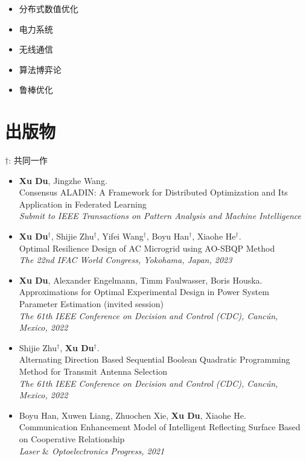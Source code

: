 \documentclass[paper=a4,fontsize=11pt]{scrartcl} %
\newcommand{\NewPart}[1]{\section*{\uppercase{#1}}}
\newcommand{\EducationEntry}[4]{
		\noindent \textbf{#1} \hfill      %
		\colorbox{White}{%
			\parbox{5cm}{%
			\hfill\color{Black}#2}} \par  %
		\noindent \textit{#3} \par        %
		\noindent\hangindent=2em\hangafter=0 \small #4 %
		\normalsize \par}
\begin{document}
\begin{CJK*}{UTF8}{gbsn}
\begin{itemize}
	\item{分布式数值优化}
	
	\item{电力系统}
	\item{无线通信}
	\item{算法博弈论}
		\item{鲁棒优化}
\end{itemize}


\NewPart{出版物}{}
$\dag$:  共同一作
\begin{itemize}
	\item  { \textbf{Xu Du}, Jingzhe Wang. \\
		{Consensus ALADIN: A Framework for
			Distributed Optimization and Its Application in
			Federated Learning}\\
		\emph{ Submit to IEEE Transactions on Pattern Analysis and Machine Intelligence
	} }
	
		\item  { \textbf{Xu Du}$^{\dag}$, Shijie Zhu$^{\dag}$, Yifei Wang$^{\dag}$, Boyu Han$^{\dag}$, Xiaohe He$^{\dag}$. \\
		{Optimal Resilience Design of AC Microgrid
			using AO-SBQP Method}\\
		\emph{ The 22nd IFAC World Congress, Yokohama, Japan, 2023} }
	
	
		\item  { \textbf{Xu Du}, Alexander Engelmann, Timm Faulwasser, Boris Houska. \\
		{Approximations for Optimal Experimental Design
			in Power System Parameter Estimation (invited session)}\\
		\emph{ The 61th IEEE Conference on Decision and Control (CDC), Canc\'un, Mexico, 2022
		} }
	
	
	\item  { Shijie Zhu$^{\dag}$, \textbf{Xu Du}$^{\dag}$. \\
		{Alternating Direction Based Sequential Boolean Quadratic Programming Method for Transmit Antenna Selection}\\
		\emph{ The 61th IEEE Conference on Decision and Control (CDC), Canc\'un, Mexico, 2022
	} }
	
		\item  { Boyu Han, Xuwen Liang, Zhuochen Xie, \textbf{Xu Du}, Xiaohe He. \\
		{Communication Enhancement Model of Intelligent Reflecting Surface Based on Cooperative Relationship}\\
		\emph{Laser $\&$ Optoelectronics Progress, 2021
	} }
	

\end{itemize}
\end{CJK*}
\end{document}
